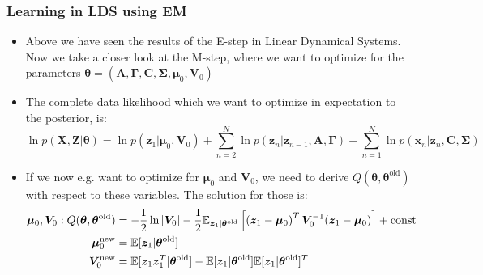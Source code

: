 \subsubsection{Learning in LDS using EM}
\begin{itemize}
	\item Above we have seen the results of the E-step in Linear Dynamical Systems. Now we take a closer look at the M-step, where we want to optimize for the parameters $\bm{\theta}=(\bm{A}, \bm{\Gamma}, \bm{C}, \bm{\Sigma}, \bm{\mu}_0, \bm{V}_0)$
	\item The complete data likelihood which we want to optimize in expectation to the posterior, is:
	$$\ln p(\bm{X},\bm{Z}|\bm{\theta}) = \ln p(\bm{z}_1|\bm{\mu}_0, \bm{V}_0) + \sum_{n=2}^{N} \ln p(\bm{z}_n|\bm{z}_{n-1}, \bm{A}, \bm{\Gamma}) + \sum_{n=1}^{N} \ln p(\bm{x}_n|\bm{z}_n,\bm{C},\bm{\Sigma})$$ 
	\item If we now e.g. want to optimize for $\bm{\mu}_0$ and $\bm{V}_0$, we need to derive $Q(\bm{\theta}, \bm{\theta}^{\text{old}})$ with respect to these variables. The solution for those is:
	\begin{equation*}
		\begin{split}
			\bm{\mu}_0, \bm{V}_0: Q(\bm{\theta}, \bm{\theta}^{\text{old}}) & = -\frac{1}{2}\ln \left|\bm{V}_0\right| - \frac{1}{2}\mathbb{E}_{\bm{z}_1|\bm{\theta}^{\text{old}}}\left[\left(\bm{z}_1 - \bm{\mu}_0\right)^T \bm{V}_0^{-1}(\bm{z}_1 - \bm{\mu}_0)\right] + \text{const}\\
			\bm{\mu}_0^{\text{new}} & = \mathbb{E}[\bm{z}_1|\bm{\theta}^{\text{old}}]\\
			\bm{V}_0^{\text{new}} & = \mathbb{E}[\bm{z}_1\bm{z}_1^T|\bm{\theta}^{\text{old}}] - \mathbb{E}[\bm{z}_1|\bm{\theta}^{\text{old}}]\mathbb{E}[\bm{z}_1|\bm{\theta}^{\text{old}}]^T
		\end{split}
	\end{equation*}
\end{itemize}